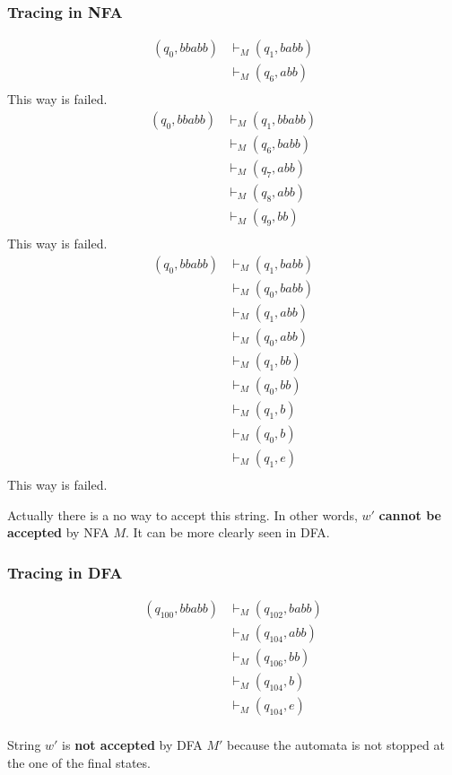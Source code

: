 \subsubsection*{Tracing in NFA}

\begin{align*}
    (q_0, bbabb) &\vdash_M (q_1, babb)\\
                 &\vdash_M (q_6, abb)\\
\end{align*}
This way is failed.
\begin{align*}
    (q_0, bbabb) &\vdash_M (q_1, bbabb)\\
                 &\vdash_M (q_6, babb)\\
                 &\vdash_M (q_7, abb)\\
                 &\vdash_M (q_8, abb)\\
                 &\vdash_M (q_9, bb)\\
\end{align*}
This way is failed.
\begin{align*}
    (q_0, bbabb) &\vdash_M (q_1, babb)\\
                 &\vdash_M (q_0, babb)\\
                 &\vdash_M (q_1, abb)\\
                 &\vdash_M (q_0, abb)\\
                 &\vdash_M (q_1, bb)\\
                 &\vdash_M (q_0, bb)\\
                 &\vdash_M (q_1, b)\\
                 &\vdash_M (q_0, b)\\
                 &\vdash_M (q_1, e)\\
\end{align*}
This way is failed.

Actually there is a no way to accept this string. In other words, $w'$ \textbf{cannot be accepted} by NFA $M$. It can be more clearly seen in DFA.

\subsubsection*{Tracing in DFA}

\begin{align*}
    (q_{100}, bbabb) &\vdash_M (q_{102}, babb)\\
                     &\vdash_M (q_{104}, abb)\\
                     &\vdash_M (q_{106}, bb)\\
                     &\vdash_M (q_{104}, b)\\
                     &\vdash_M (q_{104}, e)\\
\end{align*}

\noindent String $w'$ is \textbf{not accepted} by DFA $M'$ because the automata is not stopped at the one of the final states.
